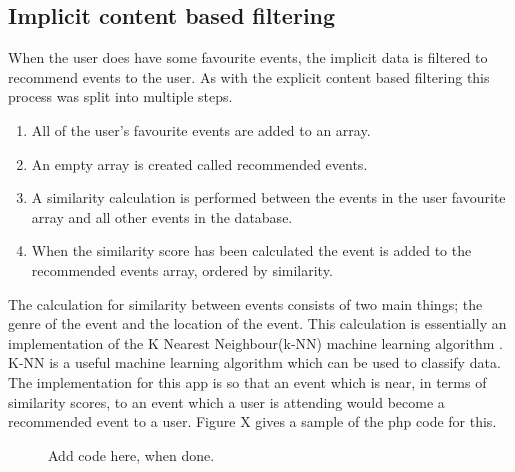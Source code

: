 \subsection{Implicit content based filtering}
When the user does have some favourite events, the implicit data is filtered to recommend events to the user. As with the explicit content based filtering this process was split into multiple steps.
\begin{enumerate} 
  \item All of the user's favourite events are added to an array.
  \item An empty array is created called recommended events.
  \item A similarity calculation is performed between the events in the user favourite array and all other events in the database.
  \item When the similarity score has been calculated the event is added to the recommended events array, ordered by similarity. 
\end{enumerate}
The calculation for similarity between events consists of two main things; the genre of the event and the location of the event. This calculation is essentially an implementation of the K Nearest Neighbour(k-NN) machine learning algorithm \cite{knn} \cite{knn2}. K-NN is a useful machine learning algorithm which can be used to classify data. The implementation for this app is so that an event which is near, in terms of similarity scores, to an event which a user is attending would become a recommended event to a user. Figure X gives a sample of the php code for this.
\begin{figure}
\caption{Add code here, when done.}
\end{figure}

